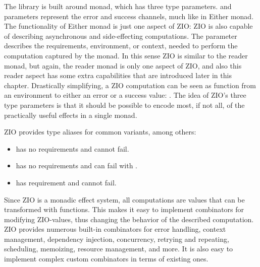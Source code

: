 The library is built around  monad, which has three type parameters.  and  parameters represent the error and success channels, much like in Either monad. The functionality of Either monad is just one aspect of ZIO: ZIO is also capable of describing asynchronous and side-effecting computations. The  parameter describes the requirements, environment, or context, needed to perform the computation captured by the monad. In this sense ZIO is similar to the reader monad, but again, the reader monad is only one aspect of ZIO, and also this reader aspect has some extra capabilities that are introduced later in this chapter. Drastically simplifying, a ZIO computation can be seen as function from an environment to either an error or a success value: . The idea of ZIO's three type parameters is that it should be possible to encode most, if not all, of the practically useful effects in a single monad. 

ZIO provides type aliases for common variants, among others:
\begin{itemize}
    \item {} has no requirements and cannot fail.
    \item {} has no requirements and can fail with .
    \item {} has requirement  and cannot fail.
\end{itemize}

Since ZIO is a monadic effect system, all computations are values that can be transformed with functions. This makes it easy to implement combinators for modifying ZIO-values, thus changing the behavior of the described computation. ZIO provides numerous built-in combinators for error handling, context management, dependency injection, concurrency, retrying and repeating, scheduling, memoizing, resource management, and more. It is also easy to implement complex custom combinators in terms of existing ones.

